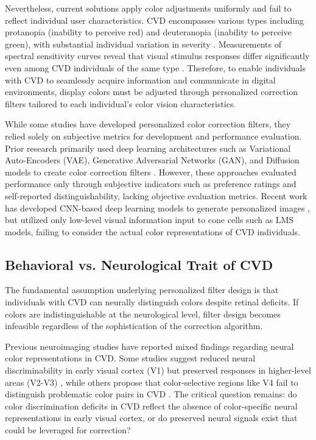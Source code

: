 \documentclass[12pt,a4paper]{article}
\begin{document}
Nevertheless, current solutions apply color adjustments uniformly and fail to reflect individual user characteristics. CVD encompasses various types including protanopia (inability to perceive red) and deuteranopia (inability to perceive green), with substantial individual variation in severity \parencite{Khatri2019}. Measurements of spectral sensitivity curves reveal that visual stimulus responses differ significantly even among CVD individuals of the same type \parencite{AdachiUsami1974}. Therefore, to enable individuals with CVD to seamlessly acquire information and communicate in digital environments, display colors must be adjusted through personalized correction filters tailored to each individual's color vision characteristics.

While some studies have developed personalized color correction filters, they relied solely on subjective metrics for development and performance evaluation. Prior research primarily used deep learning architectures such as Variational Auto-Encoders (VAE), Generative Adversarial Networks (GAN), and Diffusion models to create color correction filters \parencite{Gangwani2024}. However, these approaches evaluated performance only through subjective indicators such as preference ratings and self-reported distinguishability, lacking objective evaluation metrics. Recent work has developed CNN-based deep learning models to generate personalized images \parencite{Jiang2023}, but utilized only low-level visual information input to cone cells such as LMS models, failing to consider the actual color representations of CVD individuals.

\subsection{Behavioral vs. Neurological Trait of CVD}

The fundamental assumption underlying personalized filter design is that individuals with CVD can neurally distinguish colors despite retinal deficits. If colors are indistinguishable at the neurological level, filter design becomes infeasible regardless of the sophistication of the correction algorithm.

Previous neuroimaging studies have reported mixed findings regarding neural color representations in CVD. Some studies suggest reduced neural discriminability in early visual cortex (V1) but preserved responses in higher-level areas (V2-V3) \parencite{Tregillus2021}, while others propose that color-selective regions like V4 fail to distinguish problematic color pairs in CVD \parencite{Neitz2011}. The critical question remains: do color discrimination deficits in CVD reflect the absence of color-specific neural representations in early visual cortex, or do preserved neural signals exist that could be leveraged for correction?
\end{document}
